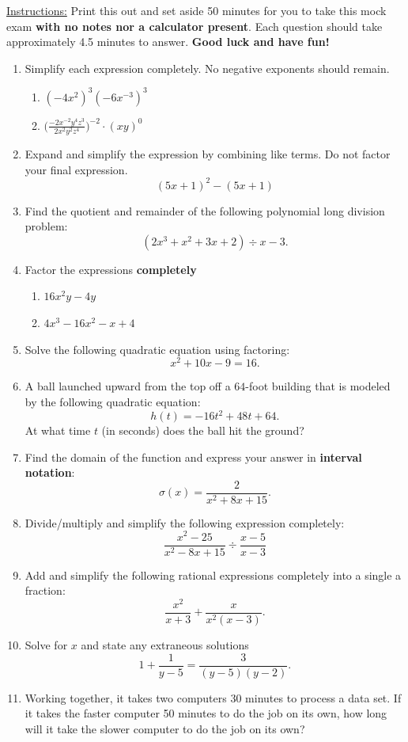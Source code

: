 \documentclass[a4paper]{article}
\begin{document}
\rhead{\thepage}

\underline{Instructions:} Print this out and set aside 50 minutes for you to take this mock exam \textbf{with no notes nor a calculator present}. Each question should take approximately 4.5 minutes to answer. \textbf{Good luck and have fun!}  
\begin{enumerate}
    \item Simplify each expression completely. No negative exponents should remain. 
       \begin{enumerate}
           \item \( (- 4 x^{2})^{3} (-6 x^{-3})^{3} \)
           \item \( \Big( \frac{ -2 x^{-2} y^{4} z^{3} }{ 2 x^{2} y^{2} z^{4} }  \Big)^{-2} \cdot (xy)^{0} \) 
       \end{enumerate}  
    \item Expand and simplify the expression by combining like terms. Do not factor your final expression.
        \[ (5x + 1)^{2} - (5x + 1) \]
    \item Find the quotient and remainder of the following polynomial long division problem: 
        \[ (2x^{3} + x^{2} + 3x + 2) \div x - 3. \]
    \item Factor the expressions \textbf{completely}
        \begin{enumerate}
            \item \( 16 x^{2} y - 4y   \)
            \item \( 4 x^{3} - 16 x^{2} - x + 4  \)
        \end{enumerate}
    \item Solve the following quadratic equation using factoring:
        \[  x^{2} + 10x - 9 = 16.  \]
    \item A ball launched upward from the top off a \( 64 \)-foot building that is modeled by the following quadratic equation: 
        \[  h(t) = - 16 t^{2} + 48 t  + 64. \]
        At what time \( t  \) (in seconds) does the ball hit the ground?
    \item Find the domain of the function and express your answer in \textbf{interval notation}:
        \[ \sigma(x) = \frac{ 2  }{ x^{2} + 8 x + 15 }.    \]
    \item Divide/multiply and simplify the following expression completely:
        \[  \frac{ x^{2} - 25 }{   x^{2} - 8x + 15 } \div \frac{ x - 5  }{  x - 3  }  \]
    \item Add and simplify the following rational expressions completely into a single a fraction:
        \[  \frac{ x^{2}  }{  x + 3  }  + \frac{ x  }{ x^{2} (x - 3) }.  \]
    \item Solve for \( x  \) and state any extraneous solutions
        \[  1 + \frac{ 1  }{ y - 5 }  = \frac{ 3  }{ (y-5)(y-2) }.  \]
    \item Working together, it takes two computers \( 30 \) minutes to process a data set. If it takes the faster computer 50 minutes to do the job on its own, how long will it take the slower computer to do the job on its own?
\end{enumerate}
\end{document}
